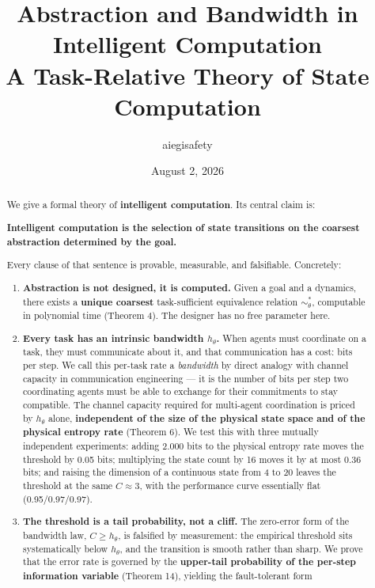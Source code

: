 \documentclass[11pt]{article}
\title{\textbf{Abstraction and Bandwidth in Intelligent Computation}\\[4pt]
\large A Task-Relative Theory of State Computation}
\author{aiegisafety}
\date{August 2, 2026}
\renewenvironment{quote}
  {\def\FrameCommand{{\color{gray!60}\vrule width 2pt}\hspace{8pt}}%
   \MakeFramed{\advance\hsize-\width \FrameRestore}\begin{itshape}}
  {\end{itshape}\endMakeFramed}
\begin{document}
\maketitle

\begin{abstract}
We give a formal theory of \textbf{intelligent computation}. Its central claim is:

\begin{quote}
\textbf{Intelligent computation is the selection of state transitions on the coarsest abstraction determined by the goal.}
\end{quote}

Every clause of that sentence is provable, measurable, and falsifiable. Concretely:

\begin{enumerate}
\def\labelenumi{\arabic{enumi}.}
\item
  \textbf{Abstraction is not designed, it is computed.} Given a goal and a dynamics, there exists a \textbf{unique coarsest} task-sufficient equivalence relation \(\sim_\theta^*\), computable in polynomial time (Theorem 4). The designer has no free parameter here.
\item
  \textbf{Every task has an intrinsic bandwidth \(h_\theta\).} When agents must coordinate on a task, they must communicate about it, and that communication has a cost: bits per step. We call this per-task rate a \emph{bandwidth} by direct analogy with channel capacity in communication engineering --- it is the number of bits per step two coordinating agents must be able to exchange for their commitments to stay compatible. The channel capacity required for multi-agent coordination is priced by \(h_\theta\) alone, \textbf{independent of the size of the physical state space and of the physical entropy rate} (Theorem 6). We test this with three mutually independent experiments: adding 2.000 bits to the physical entropy rate moves the threshold by 0.05 bits; multiplying the state count by 16 moves it by at most 0.36 bits; and raising the dimension of a continuous state from 4 to 20 leaves the threshold at the same \(C\approx3\), with the performance curve essentially flat (0.95/0.97/0.97).
\item
  \textbf{The threshold is a tail probability, not a cliff.} The zero-error form of the bandwidth law, \(C\ge h_\theta\), is falsified by measurement: the empirical threshold sits systematically below \(h_\theta\), and the transition is smooth rather than sharp. We prove that the error rate is governed by the \textbf{upper-tail probability of the per-step information variable} (Theorem 14), yielding the fault-tolerant form

\end{enumerate}
\end{abstract}
\end{document}
